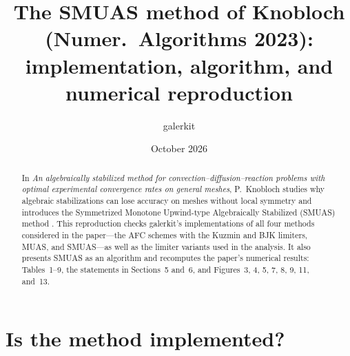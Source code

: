 \documentclass[11pt]{article}
\title{The SMUAS method of Knobloch (Numer.\ Algorithms 2023):\\ implementation, algorithm, and numerical reproduction}
\author{galerkit}
\date{October 2026}
\begin{document}
\maketitle

\begin{abstract}
In \emph{An algebraically stabilized method for convection--diffusion--reaction problems with optimal experimental
convergence rates on general meshes}, P.~Knobloch studies why algebraic stabilizations can lose accuracy on meshes
without local symmetry and introduces the Symmetrized Monotone Upwind-type Algebraically Stabilized (SMUAS) method
\cite{Kn23}. This reproduction checks galerkit's implementations of all four methods considered in the paper—the AFC
schemes with the Kuzmin and BJK limiters, MUAS, and SMUAS—as well as the limiter variants used in the analysis. It
also presents SMUAS as an algorithm and recomputes the paper's numerical results: Tables~1--9, the statements in
Sections~5 and~6, and Figures~3, 4, 5, 7, 8, 9, 11, and~13. 
\end{abstract}

\tableofcontents

\section{Is the method implemented?}\label{sec:impl}
\end{document}
